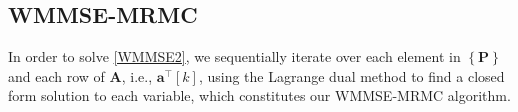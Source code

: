 \documentclass[10pt,journal]{IEEEtran}
\newcommand{\paren}[1]{\left({#1}\right)}
\newcommand{\bracket}[1]{{\left [{#1}\right ]}}
\newcommand{\braces}[1]{{\left\{ {#1}\right\}}}
\newcommand{\PiB}{\mathbf{P}_{\textrm{u},i}\bracket{k}}
\newcommand{\PBj}{\mathbf{P}_{\textrm{d},j}\bracket{k}}
\theoremstyle{definition}
\begin{document}
	\fi

	\subsection{WMMSE-MRMC} \label{subsec:seq}
	In order to solve \eqref{WMMSE2}, we sequentially iterate over each element in $\braces{\mathbf{P}}$ and each row of $\mathbf{A}$, i.e., $\mathbf{a}^\top\bracket{k}$,
	using the Lagrange dual method to find a closed form solution to each variable, which constitutes our WMMSE-MRMC algorithm. 
	
\end{document}
